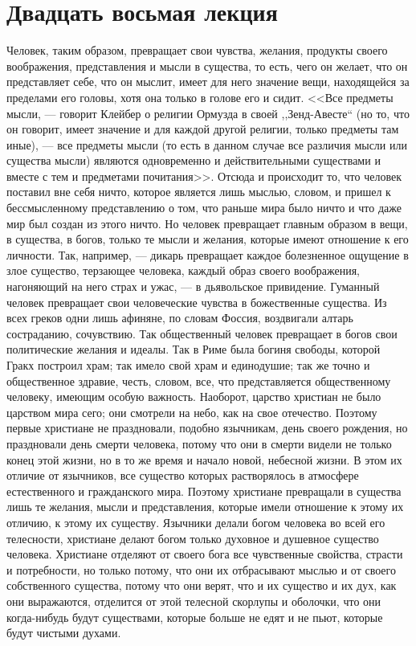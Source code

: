 \documentclass[12pt]{article}
\begin{document}
{}
\section*{Двадцать восьмая лекция}

Человек, таким образом, превращает свои чувства, желания, продукты своего воображения, представления и мысли в существа, то есть, чего он желает, что он представляет себе, что он мыслит, имеет для него значение вещи, находящейся за пределами его головы, хотя она только в голове его и сидит. <<Все предметы мысли, --- говорит Клейбер о религии Ормузда в своей ,,Зенд-Авесте`` (но то, что он говорит, имеет значение и для каждой другой религии, только предметы там иные), --- все предметы мысли (то есть в данном случае все различия мысли или существа мысли) являются одновременно и действительными существами и вместе с тем и предметами почитания>>. Отсюда и происходит то, что человек поставил вне себя ничто, которое является лишь мыслью, словом, и пришел к бессмысленному представлению о том, что раньше мира было ничто и что даже мир был создан из этого ничто. Но человек превращает главным образом в вещи, в существа, в богов, только те мысли и желания, которые имеют отношение к его личности. Так, например, --- дикарь превращает каждое болезненное ощущение в злое существо, терзающее человека, каждый образ своего воображения, нагоняющий на него страх и ужас, --- в дьявольское привидение. Гуманный человек превращает свои человеческие чувства в божественные существа. Из всех греков одни лишь афиняне, по словам Фоссия, воздвигали алтарь состраданию, сочувствию. Так общественный человек превращает в богов свои политические желания и идеалы. Так в Риме была богиня свободы, которой Гракх построил храм; так имело свой храм и единодушие; так же точно и общественное здравие, честь, словом, все, что представляется общественному человеку, имеющим особую важность. Наоборот, царство христиан не было царством мира сего; они смотрели на небо, как на свое отечество. Поэтому первые христиане не праздновали, подобно язычникам, день своего рождения, но праздновали день смерти человека, потому что они в смерти видели не только конец этой жизни, но в то же время и начало новой, небесной жизни. В этом их отличие от язычников, все существо которых растворялось в атмосфере естественного и гражданского мира. Поэтому христиане превращали в существа лишь те желания, мысли и представления, которые имели отношение к этому их отличию, к этому их существу. Язычники делали богом человека во всей его телесности, христиане делают богом только духовное и душевное существо человека. Христиане отделяют от своего бога все чувственные свойства, страсти и потребности, но только потому, что они их отбрасывают мыслью и от своего собственного существа, потому что они верят, что и их существо и их дух, как они выражаются, отделится от этой телесной скорлупы и оболочки, что они когда-нибудь будут существами, которые больше не едят и не пьют, которые будут чистыми духами. 
\end{document}
